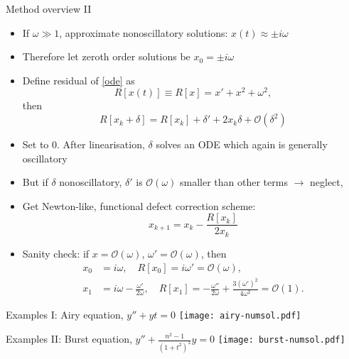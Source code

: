 \documentclass{beamer}
\numberwithin{equation}{theorem}
\begin{document}
\begin{noframe}
    Method overview II \medskip
    {\footnotesize
    \begin{itemize}
    \item{If $\omega \gg 1$, approximate nonoscillatory solutions: $x(t) \approx \pm i\omega $ } 
    \item{Therefore let zeroth order solutions be $x_0 = \pm i\omega$}
    \item{Define residual of \cref{ode} as
    \begin{equation}
    R[x(t)] \equiv R[x] = x' + x^2 + \omega^2,
    \end{equation}
    then 
    \begin{equation}
    R[x_k + \delta] = R[x_k] + \delta' + 2x_k \delta + \mathcal{O}(\delta^2)
    \end{equation}
    }
    \item{Set to 0. After linearisation, $\delta$ solves an ODE which again is generally oscillatory}
    \item{But if $\delta$ nonoscillatory, $\delta'$ is $\mathcal{O}(\omega)$ smaller than other terms $\rightarrow$ neglect,}
    \item{Get Newton-like, functional defect correction scheme:
    \begin{equation}
    x_{k+1} = x_k - \frac{R[x_k]}{2x_k}
    \end{equation}
    }
    \item{Sanity check: if $x = \mathcal{O}(\omega)$, $\omega' = \mathcal{O}(\omega)$, then
    \begin{align}
    x_0 &= i\omega, \quad R[x_0] = i\omega' = \mathcal{O}(\omega),\\ 
    x_1 &= i\omega - \frac{\omega'}{2\omega}, \quad R[x_1] = -\frac{\omega''}{2\omega} + \frac{3(\omega')^2}{4\omega^2} = \mathcal{O}(1).
    \end{align}
    }
    \end{itemize}
    }
\end{noframe}

\begin{noframe}
	Examples I: Airy equation, $y'' + yt = 0$
	\texttt{[image: airy-numsol.pdf]}
\end{noframe}

\begin{noframe}%
	Examples II: Burst equation, $y'' + \frac{n^2 - 1}{(1 + t^2)^2}y = 0$
	\texttt{[image: burst-numsol.pdf]}
\end{noframe}
\end{document}

